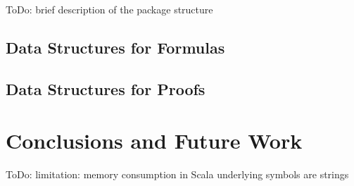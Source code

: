 \documentclass{llncs}
\begin{document}
ToDo: brief description of the package structure


\subsection{Data Structures for Formulas}


\subsection{Data Structures for Proofs}


\subsection{}



\section{Conclusions and Future Work}

ToDo: limitation: memory consumption in Scala
underlying symbols are strings





\end{document}
